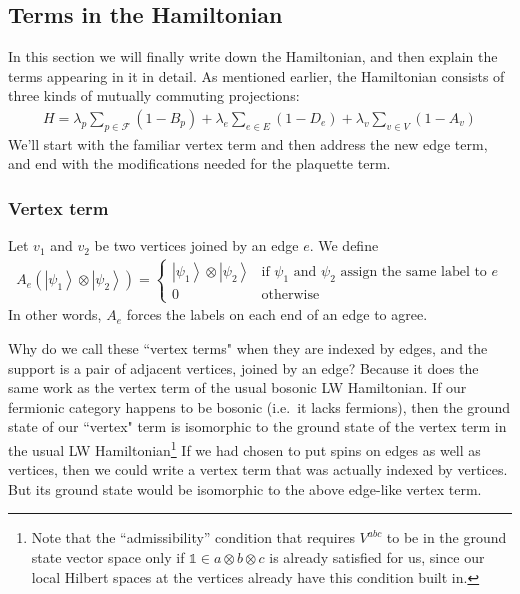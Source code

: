 \documentclass[12pt,a4paper]{article}
\newcommand{\tp}{\otimes}
\newcommand{\unit}{\mathds{1}}
\newcommand{\ket}[1]{\ensuremath{\left|#1\right\rangle}}
\begin{document}



\subsection{Terms in the Hamiltonian}

In this section we will finally write down the Hamiltonian, and then explain the terms appearing in it in detail. 
As mentioned earlier, the Hamiltonian consists of three kinds of mutually commuting projections:
\begin{align}
H = \lambda_p \sum_{p \in \mathcal{F}} (1-B_p)  + \lambda_e \sum_{e \in E} (1-D_e) + \lambda_v \sum_{v \in V} (1-A_v)
\end{align}
We'll start with the familiar vertex term and then address the new edge term, 
and end with the modifications needed for the plaquette term.




\subsubsection{Vertex term}   \label{VertexHamiltonian}

Let $v_1$ and $v_2$ be two vertices joined by an edge $e$.
We define
\begin{align}
A_e(\ket{\psi_1} \otimes \ket{\psi_2}) = 
\left\{
                \begin{array}{ll}
                   \ket{\psi_1} \otimes \ket{\psi_2} & \text{if $\psi_1$ and $\psi_2$ assign the same label to $e$} \\
                  0 & \text{otherwise}
                \end{array}
              \right.
\end{align}
In other words, $A_e$ forces the labels on each end of an edge to agree.

Why do we call these ``vertex terms" when they are indexed by edges, and the support is a pair of adjacent vertices, joined by an edge?
Because it does the same work as the vertex term of the usual bosonic LW Hamiltonian.
If our fermionic category happens to be bosonic (i.e.\ it lacks fermions), then the ground state of our ``vertex" term is isomorphic to the ground state
of the vertex term in the usual LW Hamiltonian\footnote{Note that the ``admissibility'' condition that requires $V^{abc}$ to be in the ground state vector space only if $\unit\in a\tp b \tp c$ is already satisfied for us, since our local Hilbert spaces at the vertices already have this condition built in.}
If we had chosen to put spins on edges as well as vertices, then we could write a vertex term that was actually indexed by vertices.
But its ground state would be isomorphic to the above edge-like vertex term.
\end{document}
